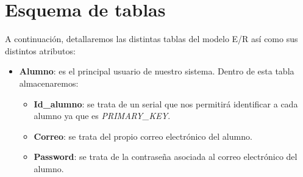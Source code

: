 \documentclass[12pt]{report}
\begin{document}
\section{Esquema de tablas}
A continuación, detallaremos las distintas tablas del modelo E/R así como sus distintos atributos:
\begin{itemize}
    \item\textbf{Alumno}: es el principal usuario de nuestro sistema. Dentro de esta tabla almacenaremos:
    \begin{itemize}
        \item \textbf{Id\_alumno}: se trata de un serial que nos permitirá identificar a cada alumno ya que es \textit{PRIMARY\_KEY}.
        \item \textbf{Correo}: se trata del propio correo electrónico del alumno.
        \item \textbf{Password}: se trata de la contraseña asociada al correo electrónico del alumno.
        \\\\\\
    \end{itemize}
    

\end{itemize}
\end{document}
